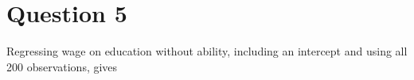 \section*{Question 5}
Regressing wage on education without ability, including an intercept and
using all 200 observations, gives

